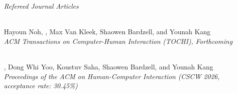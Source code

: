 \noindent \textit{Refereed Journal Articles}\\

\vspace{-0.25cm}

\hangindent=0.83cm\\
Hayoun Noh, , Max Van Kleek, Shaowen Bardzell, and Younah Kang\\
\textit{ACM Transactions on Computer-Human Interaction (TOCHI), Forthcoming}\\


\vspace{-0.25cm}

\hangindent=0.83cm\\
, Dong Whi Yoo, Koustuv Saha, Shaowen Bardzell, and Younah Kang\\
\textit{Proceedings of the ACM on Human-Computer Interaction (CSCW 2026, acceptance rate: 30.45\%) }\\


\vspace{-0.25cm}

